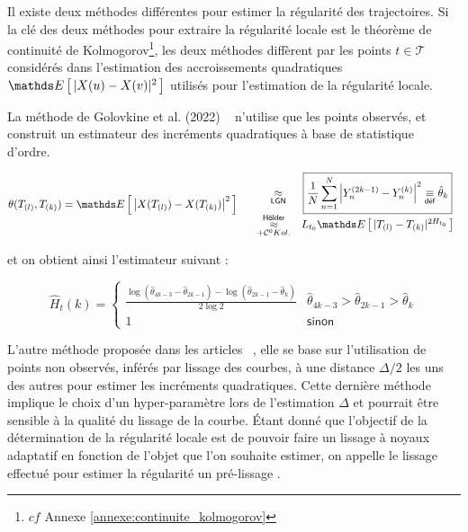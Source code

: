 
Il existe deux méthodes différentes pour estimer la régularité des trajectoires. Si la clé des deux méthodes pour extraire la régularité locale est le théorème de continuité de Kolmogorov\footnote{$cf$ Annexe \ref{annexe:continuite_kolmogorov}}, les deux méthodes diffèrent par les points $t \in \mathcal T$ considérés dans l'estimation des accroissements quadratiques $\esperance{ \vert X(u) - X(v) \vert^2 }$ utilisés pour l'estimation de la régularité locale.

\noindent La méthode de Golovkine et al. (2022) ~\cite[pages : 7—9]{golovkineRegularityOnlineEstimationNoisyCurve} n'utilise que les points observés, et construit un estimateur des incréments quadratiques à base de statistique d'ordre.

\begin{equation*}
	\theta( T_{(l)}, T_{(k)}) = \esperance{ \left| X( T_{(l)}) - X(T_{(k)}) \right|^2 }  \begin{array}{ccc}
		 & \quad \underset {\textsf{LGN}} \approx
		 & \boxed{\frac 1 {N} \sum\limits_{n=1}^N \left| \statrang Y n {2k-1} - \statrang Y n k \right|^2 \isdef \hat \theta_k}
		\\
		 & \, \underset {+ \mathcal C^0 Kol.} {\overset {\textsf{Hölder}} \approx}
		 & L_{t_0} \esperance{| \ordered T l - \ordered T k |^{2H_{t_0}}}
	\end{array}
\end{equation*}

et on obtient ainsi l'estimateur suivant :

\begin{equation*}
	\widehat H_{t}(k) =
	\begin{cases} \displaystyle\frac{\log\left( \hat \theta_{4k-3} - \hat \theta_{2k-1}  \right) - \log \left(  \hat\theta_{2k-1} - \hat \theta_k \right)}{2\log 2}
		 & \hat \theta_{4k-3} > \hat \theta_{2k-1} > \hat \theta_{k}
		\\
		1
		 & \textsf{sinon}
	\end{cases}
\end{equation*}


L'autre méthode proposée dans les articles ~\cite{golovkine2021adaptive,maissoro-SmoothnessFTSweakDep}, elle se base sur l'utilisation de points non observés, inférés par lissage des courbes, à une distance $\Delta / 2$ les uns des autres pour estimer les incréments quadratiques. 
Cette dernière méthode implique le choix d'un hyper-paramètre lors de l'estimation $\Delta$ et pourrait être sensible à la qualité du lissage de la courbe. 
Étant donné que l'objectif de la détermination de la régularité locale est de pouvoir faire un lissage à noyaux adaptatif en fonction de l'objet que l'on souhaite estimer, on appelle le lissage effectué pour estimer la régularité un \og pré-lissage \fg.

